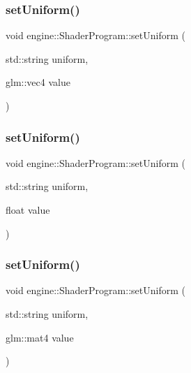 \subsubsection{\texorpdfstring{set\+Uniform()}{setUniform()}\hspace{0.1cm}{\footnotesize\ttfamily [1/3]}}
{\footnotesize\ttfamily void engine\+::\+Shader\+Program\+::set\+Uniform (\begin{DoxyParamCaption}\item[{std\+::string}]{uniform,  }\item[{glm\+::vec4}]{value }\end{DoxyParamCaption})}

\mbox{\label{classengine_1_1_shader_program_a18c5e26e9a2e44fcc996de868c70c22d}} 
\subsubsection{\texorpdfstring{set\+Uniform()}{setUniform()}\hspace{0.1cm}{\footnotesize\ttfamily [2/3]}}
{\footnotesize\ttfamily void engine\+::\+Shader\+Program\+::set\+Uniform (\begin{DoxyParamCaption}\item[{std\+::string}]{uniform,  }\item[{float}]{value }\end{DoxyParamCaption})}

\mbox{\label{classengine_1_1_shader_program_ad99e2efc09eaa6a90df11c19cd85aba7}} 
\subsubsection{\texorpdfstring{set\+Uniform()}{setUniform()}\hspace{0.1cm}{\footnotesize\ttfamily [3/3]}}
{\footnotesize\ttfamily void engine\+::\+Shader\+Program\+::set\+Uniform (\begin{DoxyParamCaption}\item[{std\+::string}]{uniform,  }\item[{glm\+::mat4}]{value }\end{DoxyParamCaption})}



